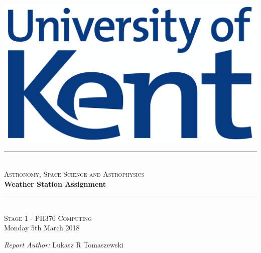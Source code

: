 \documentclass[12pt]{article}
\begin{document}
\begin{titlepage}

\newcommand{\HRule}{\rule{\linewidth}{0.5mm}}

\begin{centering} 
 

\includegraphics[scale=0.4]{Uni_of_Kent_Logo.png}\\[1cm]


\HRule \\[0.4cm]
\textsc{\large Astronomy, Space Science and Astrophysics}\\[0.4cm]
{\huge \bfseries Weather Station Assignment}\\[0.4cm]
\HRule \\[1.0cm]


\textsc{\Large Stage 1 - PH370 Computing}\\[0.5cm] 
{\large Monday 5th March 2018}\\[1.0cm]


\begin{minipage}{0.625\textwidth}
\centering

\emph{\large Report Author:} \large Lukasz R Tomaszewski \\ [0.2cm]
\end{minipage}\\[2cm]

\vfill
\end{centering} 
\end{titlepage}
\end{document}

